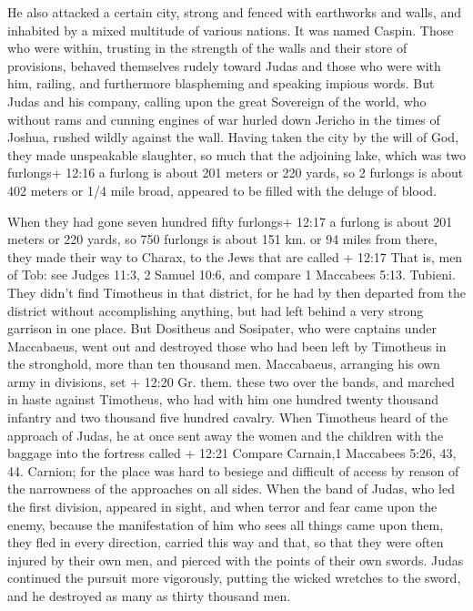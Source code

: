  He also attacked a certain city, strong and fenced with
earthworks and walls, and inhabited by a mixed multitude of various
nations. It was named Caspin.  Those who were within,
trusting in the strength of the walls and their store of provisions,
behaved themselves rudely toward Judas and those who were with him,
railing, and furthermore blaspheming and speaking impious words.
 But Judas and his company, calling upon the great
Sovereign of the world, who without rams and cunning engines of war
hurled down Jericho in the times of Joshua, rushed wildly against the
wall.  Having taken the city by the will of God, they made
unspeakable slaughter, so much that the adjoining lake, which was two
furlongs+ 12:16 a furlong is about 201 meters or 220 yards, so 2
furlongs is about 402 meters or 1/4 mile broad, appeared to be filled
with the deluge of blood.

 When they had gone seven hundred fifty furlongs+ 12:17 a
furlong is about 201 meters or 220 yards, so 750 furlongs is about 151
km. or 94 miles from there, they made their way to Charax, to the Jews
that are called + 12:17 That is, men of Tob: see Judges 11:3, 2 Samuel
10:6, and compare 1 Maccabees 5:13. Tubieni.  They didn't
find Timotheus in that district, for he had by then departed from the
district without accomplishing anything, but had left behind a very
strong garrison in one place.  But Dositheus and Sosipater,
who were captains under Maccabaeus, went out and destroyed those who had
been left by Timotheus in the stronghold, more than ten thousand men.
 Maccabaeus, arranging his own army in divisions, set +
12:20 Gr. them. these two over the bands, and marched in haste against
Timotheus, who had with him one hundred twenty thousand infantry and two
thousand five hundred cavalry.  When Timotheus heard of the
approach of Judas, he at once sent away the women and the children with
the baggage into the fortress called + 12:21 Compare Carnain,1 Maccabees
5:26, 43, 44. Carnion; for the place was hard to besiege and difficult
of access by reason of the narrowness of the approaches on all sides.
 When the band of Judas, who led the first division,
appeared in sight, and when terror and fear came upon the enemy, because
the manifestation of him who sees all things came upon them, they fled
in every direction, carried this way and that, so that they were often
injured by their own men, and pierced with the points of their own
swords.  Judas continued the pursuit more vigorously,
putting the wicked wretches to the sword, and he destroyed as many as
thirty thousand men.

